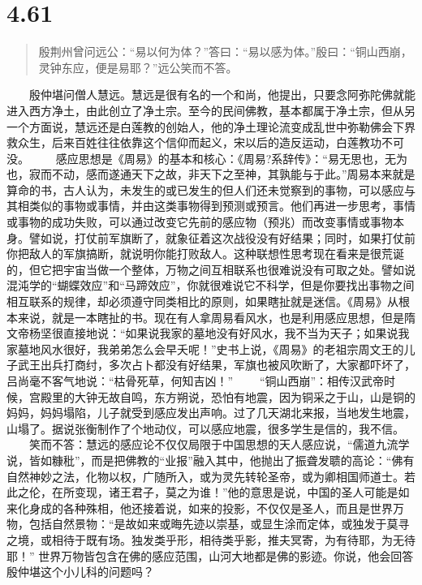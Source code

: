 \documentclass[]{book}
\begin{document}
\section{4.61}\label{section-238}

\begin{quote}
殷荆州曾问远公：``易以何为体？''答曰：``易以感为体。''殷曰：``铜山西崩，灵钟东应，便是易耶？''远公笑而不答。
\end{quote}

　　殷仲堪问僧人慧远。慧远是很有名的一个和尚，他提出，只要念阿弥陀佛就能进入西方净土，由此创立了净土宗。至今的民间佛教，基本都属于净土宗，但从另一个方面说，慧远还是白莲教的创始人，他的净土理论流变成乱世中弥勒佛会下界救众生，后来百姓往往依靠这个信仰而起义，宋以后的造反运动，白莲教功不可没。
　　感应思想是《周易》的基本和核心：《周易?系辞传》：``易无思也，无为也，寂而不动，感而遂通天下之故，非天下之至神，其孰能与于此。''周易本来就是算命的书，古人认为，未发生的或已发生的但人们还未觉察到的事物，可以感应与其相类似的事物或事情，并由这类事物得到预测或预言。他们再进一步思考，事情或事物的成功失败，可以通过改变它先前的感应物（预兆）而改变事情或事物本身。譬如说，打仗前军旗断了，就象征着这次战役没有好结果；同时，如果打仗前你把敌人的军旗搞断，就说明你能打败敌人。这种联想性思考现在看来是很荒诞的，但它把宇宙当做一个整体，万物之间互相联系也很难说没有可取之处。譬如说混沌学的``蝴蝶效应''和``马蹄效应''，你就很难说它不科学，但是你要找出事物之间相互联系的规律，却必须遵守同类相比的原则，如果瞎扯就是迷信。《周易》从根本来说，就是一本瞎扯的书。现在有人拿周易看风水，也是利用感应思想，但是隋文帝杨坚很直接地说：``如果说我家的墓地没有好风水，我不当为天子；如果说我家墓地风水很好，我弟弟怎么会早夭呢！''史书上说，《周易》的老祖宗周文王的儿子武王出兵打商纣，多次占卜都没有好结果，军旗也被风吹断了，大家都吓坏了，吕尚毫不客气地说：``枯骨死草，何知吉凶！''
　　``铜山西崩''：相传汉武帝时候，宫殿里的大钟无故自鸣，东方朔说，恐怕有地震，因为铜采之于山，山是铜的妈妈，妈妈塌陷，儿子就受到感应发出声响。过了几天湖北来报，当地发生地震，山塌了。据说张衡制作了个地动仪，可以感应地震，很多学生是信的，我不信。
　　笑而不答：慧远的感应论不仅仅局限于中国思想的天人感应说，``儒道九流学说，皆如糠秕''，而是把佛教的``业报''融入其中，他抛出了振聋发聩的高论：``佛有自然神妙之法，化物以权，广随所入，或为灵先转轮圣帝，或为卿相国师道士。若此之伦，在所变现，诸王君子，莫之为谁！''他的意思是说，中国的圣人可能是如来化身成的各种殊相，他还接着说，如来的投影，不仅仅是圣人，而且是世界万物，包括自然景物：``是故如来或晦先迹以崇基，或显生涂而定体，或独发于莫寻之境，或相待于既有场。独发类乎形，相待类乎影，推夫冥寄，为有待耶，为无待耶！''
世界万物皆包含在佛的感应范围，山河大地都是佛的影迹。你说，他会回答殷仲堪这个小儿科的问题吗？
\end{document}
